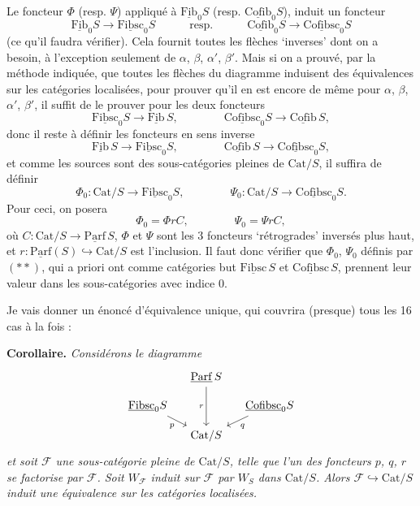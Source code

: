 \documentclass[11pt]{article}
\newcommand{\printedpage}[1]{\marginpar{\footnotesize p.~#1}}
\newcommand{\msp}[1]{\marginpar{\footnotesize [#1]}}
\newcommand{\ul}[1]{\underline{\mathrm{#1}}}
\begin{document}
\printedpage{7}
Le foncteur $\Phi$ (resp. $\Psi$) appliqué à $\ul{Fib}_0S$ (resp. $\ul{Cofib}_0S$), induit un foncteur
\[
\ul{Fib}_0S \longrightarrow \ul{Fibsc}_0S \qquad\quad \text{resp.} \qquad\quad \ul{Cofib}_0S \longrightarrow \ul{Cofibsc}_0S \tag*{$(*)$}
\]
(ce qu'il faudra vérifier). Cela fournit toutes les flèches `inverses' dont on a besoin, à l'exception seulement de $\alpha$, $\beta$, $\alpha'$, $\beta'$. Mais si on a prouvé, par la méthode indiquée, que toutes les flèches du diagramme induisent des équivalences sur les catégories localisées, pour prouver qu'il en est encore de même pour $\alpha$, $\beta$, $\alpha'$, $\beta'$, il suffit de le prouver pour les deux foncteurs
\[
\ul{Fibsc}_0S \longrightarrow \ul{Fib}\,S, \qquad\qquad \ul{Cofibsc}_0S \longrightarrow \ul{Cofib}\,S,
\]
donc il reste à définir les foncteurs en sens inverse
\[
\ul{Fib}\,S \longrightarrow \ul{Fibsc}_0S, \qquad\qquad \ul{Cofib}\,S \longrightarrow \ul{Cofibsc}_0S,
\]
et comme les sources sont des sous-catégories pleines de $\mathrm{Cat}/S$, il suffira de définir
\[
\Phi_0 : \mathrm{Cat}/S \longrightarrow \ul{Fibsc}_0S, \qquad\qquad \Psi_0 : \mathrm{Cat}/S \longrightarrow \ul{Cofibsc}_0S.
\]
Pour ceci, on posera
\[
\Phi_0 = \Phi r C, \qquad\qquad \Psi_0 = \Psi r C, \tag*{$(**)$}
\]
\msp{page 10}
où $C : \mathrm{Cat}/S \longrightarrow \ul{Parf}\,S$, $\Phi$ et $\Psi$ sont les 3 foncteurs `rétrogrades' inversés plus haut, et $r : \ul{Parf}(S) \hookrightarrow \mathrm{Cat}/S$ est l'inclusion. Il faut donc vérifier que $\Phi_0$, $\Psi_0$ définis par $(**)$, qui a priori ont comme catégories but $\ul{Fibsc}\,S$ et $\ul{Cofibsc}\,S$, prennent leur valeur dans les sous-catégories avec indice 0.

Je vais donner un énoncé d'équivalence unique, qui couvrira (presque) tous les 16 cas à la fois :

\textbf{Corollaire.} \textit{Considérons le diagramme}
\[
\begin{tikzcd}[column sep=small, row sep=small]
 & \ul{Parf}\,S \arrow[dd, "r"'] & \\
\ul{Fibsc}_0S \arrow[dr, "p"'] & & \ul{Cofibsc}_0S \arrow[dl, "q"] \\
 & \mathrm{Cat}/S &
\end{tikzcd}
\]
\textit{et soit $\mathcal{F}$ une sous-catégorie pleine de $\mathrm{Cat}/S$, telle que l'un des foncteurs $p$, $q$, $r$ se factorise par $\mathcal{F}$. Soit $W_{\mathcal{F}}$ induit sur $\mathcal{F}$ par $W_S$ dans $\mathrm{Cat}/S$. Alors $\mathcal{F} \hookrightarrow \mathrm{Cat}/S$ induit une équivalence sur les catégories localisées.}
\end{document}
